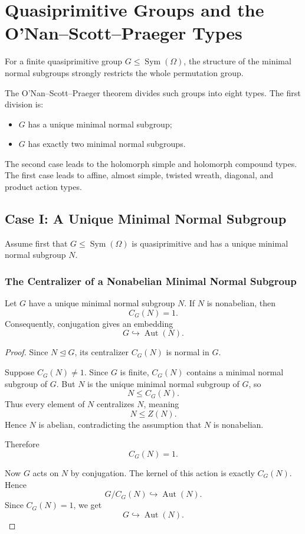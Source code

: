 
\chapter{Quasiprimitive Groups and the O'Nan--Scott--Praeger Types}
\label{chap:quasiprimitive-ons-praeger}

\begin{topic}
For a finite quasiprimitive group \(G\leq \operatorname{Sym}(\Omega)\), the structure of
the minimal normal subgroups strongly restricts the whole permutation group.

The O'Nan--Scott--Praeger theorem divides such groups into eight types. The first
division is:

\begin{itemize}
    \item \(G\) has a unique minimal normal subgroup;
    \item \(G\) has exactly two minimal normal subgroups.
\end{itemize}

The second case leads to the holomorph simple and holomorph compound types.
The first case leads to affine, almost simple, twisted wreath, diagonal, and product
action types.
\end{topic}

\section{Case I: A Unique Minimal Normal Subgroup}

Assume first that \(G\leq \operatorname{Sym}(\Omega)\) is quasiprimitive and has a unique
minimal normal subgroup \(N\).

\subsection{The Centralizer of a Nonabelian Minimal Normal Subgroup}

\begin{lemma}
Let \(G\) have a unique minimal normal subgroup \(N\). If \(N\) is nonabelian, then
\[
    C_G(N)=1.
\]
Consequently, conjugation gives an embedding
\[
    G\hookrightarrow \operatorname{Aut}(N).
\]
\end{lemma}

\begin{proof}
Since \(N\unlhd G\), its centralizer \(C_G(N)\) is normal in \(G\).

Suppose \(C_G(N)\neq 1\). Since \(G\) is finite, \(C_G(N)\) contains a minimal normal
subgroup of \(G\). But \(N\) is the unique minimal normal subgroup of \(G\), so
\[
    N\leq C_G(N).
\]
Thus every element of \(N\) centralizes \(N\), meaning
\[
    N\leq Z(N).
\]
Hence \(N\) is abelian, contradicting the assumption that \(N\) is nonabelian.

Therefore
\[
    C_G(N)=1.
\]

Now \(G\) acts on \(N\) by conjugation. The kernel of this action is exactly \(C_G(N)\).
Hence
\[
    G/C_G(N)\hookrightarrow \operatorname{Aut}(N).
\]
Since \(C_G(N)=1\), we get
\[
    G\hookrightarrow \operatorname{Aut}(N).
\]
\end{proof}

